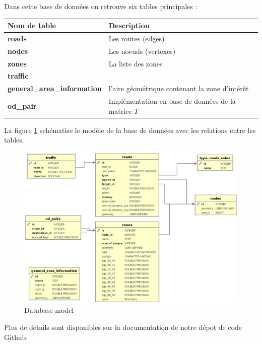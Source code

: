 Dans cette base de données on retrouve six tables principales :

\begin{tabular}{|l|l|}
  \hline
  Nom de table & Description \\
  \hline
  \hline
  \textbf{roads} & Les routes (edges)\\
  \textbf{nodes} & Les noeuds (vertexes)\\
  \textbf{zones} & La liste des zones\\ 
  \textbf{traffic} & \\
  \textbf{general\_area\_information} & l'aire géométrique contenant la zone d'intérêt\\
  \textbf{od\_pair} & Implémentation en base de données de la matrice $T$ \\
  \hline
\end{tabular}



La figure \ref{img.schema} schématise le modèle de la base de données avec les relations entre les tables.

\begin{figure}[ht]
  \centering
  \includegraphics[width=15cm]{img/c01-transp-model/db.eps}
  \caption{Database model}
  \label{img.schema}
\end{figure}


Plus de détails sont disponibles sur la documentation de notre dépot de code Github.

